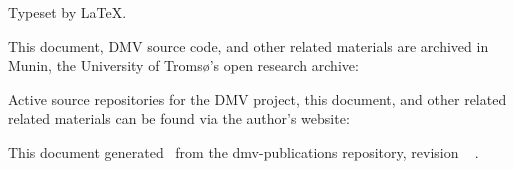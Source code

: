 
\clearpage
\vspace*{\fill}

Typeset by \LaTeX.

This document, \gls{DMV} source code, and other related materials are archived
in Munin, the University of Tromsø's open research archive: \\
\muninurl

Active source repositories for the \gls{DMV} project, this document, and other
related related materials can be found via the author's website: \\
\dmvurl

This document generated \GITAuthorDate\ from the dmv-publications
repository, revision
\ifx\GITTags\empty
\GITAbrHash
\else
\GITAbrHash\ \GITTags
\fi
.

\clearpage
